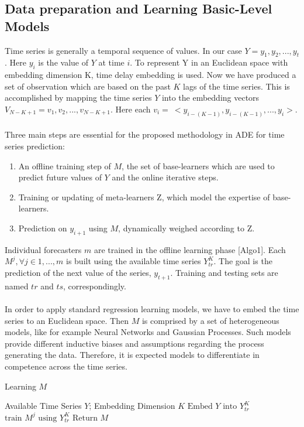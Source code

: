 \documentclass[runningheads,a4paper]{llncs}[2015/06/24]
\begin{document}
\subsection{Data preparation and Learning Basic-Level Models}
Time series is generally a temporal sequence of values. In our case $Y={y_1,y_2,...,y_t}$. Here $y_i$ is the value of $Y$ at time $i$. To represent Y in an Euclidean space with embedding dimension K, time delay embedding is used. Now we have produced a set of observation which are based on the past $K$ lags of the time series. This is accomplished by mapping the time series $Y$ into the embedding vectors $V_{N-K+1} = {v_1,v_2,...,v_{N-K+1}}$. Here each $v_i =\ <y_{i-(K-1)},y_{i-(K-1)},...,y_i>$. \\\\ Three main steps are essential for the proposed methodology in ADE for time series prediction:
\begin{enumerate}
\item An offline training step of $M$, the set of base-learners which are used to predict future values of $Y$ and the online iterative steps.
\item Training or updating of meta-learners Z, which model the expertise of base-learners.
\item Prediction on $y_{i+1}$ using $M$, dynamically weighed according to Z.
\end{enumerate}
Individual forecasters $m$ are trained in the offline learning phase [Algo1]. Each $M^j, ∀j ∈ {1,...,m}$ is built using the available time series $Y^K_{tr}$. The goal is the prediction of the next value of the series, $y_{t+1}$. Training and testing sets are named $tr$ and $ts$, correspondingly. \\\\ In order to apply standard regression learning models, we have to embed the time series to an Euclidean space. Then $M$ is comprised by a set of heterogeneous models, like for example Neural Networks and Gaussian Processes. Such models provide different inductive biases and assumptions regarding the process generating the data. Therefore, it is expected models to differentiate in competence across the time series.

\begin{algorithm}[h]

\caption{Learning $M$}\label{alg:learning}
\begin{algorithmic}[1]

\Require Available Time Series $Y$; Embedding Dimension $K$
\State $\text{Embed $Y$ into $Y_{tr}^{K}$}$
\State $\text{train $M^j$ using $Y_{tr}^K$}$
\EndFor
\State $\text{Return $M$}$
\end{algorithmic}
\end{algorithm}
\end{document}
